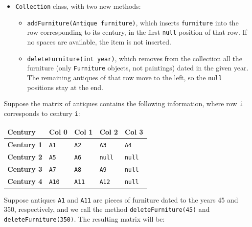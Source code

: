 \begin{itemize}
    \item \texttt{Collection} class, with two new methods:

        \begin{itemize}

            \item \texttt{addFurniture(Antique furniture)}, which inserts \texttt{furniture} into the row corresponding to its century, in the first \texttt{null} position of that row. If no spaces are available, the item is not inserted.

            \item \texttt{deleteFurniture(int year)}, which removes from the collection all the furniture (only \texttt{Furniture} objects, not paintings) dated in the given year. The remaining antiques of that row move to the left, so the \texttt{null} positions stay at the end.

        \end{itemize}

\end{itemize}

Suppose the matrix of antiques contains the following information, where row \texttt{i} corresponds to century \texttt{i}:

\begin{center}
    \begin{tabular}{lllll}
        \hline
        Century & Col 0 & Col 1 & Col 2 & Col 3 \\
        \hline
        \textbf{Century 1} & \texttt{A1} & \texttt{A2} & \texttt{A3} & \texttt{A4} \\
        \textbf{Century 2} & \texttt{A5} & \texttt{A6} & \texttt{null} & \texttt{null} \\
        \textbf{Century 3} & \texttt{A7} & \texttt{A8} & \texttt{A9} & \texttt{null} \\
        \textbf{Century 4} & \texttt{A10} & \texttt{A11} & \texttt{A12} & \texttt{null} \\
        \hline
    \end{tabular}
\end{center}

Suppose antiques \texttt{A1} and \texttt{A11} are pieces of furniture dated to the years 45 and 350, respectively, and we call the method \texttt{deleteFurniture(45)} and \texttt{deleteFurniture(350)}. The resulting matrix will be:

